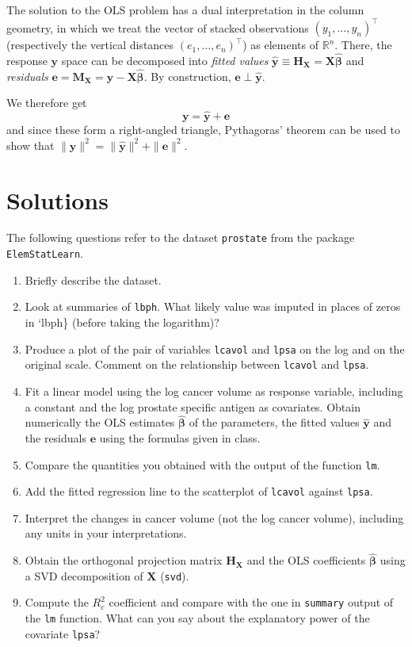\documentclass[]{book}
\providecommand{\tightlist}{%
  \setlength{\itemsep}{0pt}\setlength{\parskip}{0pt}}
\theoremstyle{definition}
\theoremstyle{definition}
\theoremstyle{definition}
\theoremstyle{remark}
\begin{document}
The solution to the OLS problem has a dual interpretation in the column geometry, in which we treat the vector of stacked observations \((y_1, \ldots, y_n)^\top\) (respectively the vertical distances \((e_1, \ldots, e_n)^\top\)) as elements of \(\mathbb{R}^n\). There, the response \(\boldsymbol{y}\) space can be decomposed into \emph{fitted values} \(\hat{{\boldsymbol{y}}} \equiv \mathbf{H}_{\mathbf{X}} = \mathbf{X}\hat{\boldsymbol{\beta}}\) and \emph{residuals} \(\boldsymbol{e} = \mathbf{M}_{\mathbf{X}} = \boldsymbol{y} - \mathbf{X}\hat{\boldsymbol{\beta}}\). By construction, \(\boldsymbol{e} \perp \hat{{\boldsymbol{y}}}\).

We therefore get \[\boldsymbol{y} = \hat{\boldsymbol{y}} + \boldsymbol{e}\]
and since these form a right-angled triangle, Pythagoras' theorem can be used to show that
\(\|\boldsymbol{y}\|^2 = \|\hat{\boldsymbol{y}}\|^2 + \|\boldsymbol{e}\|^2.\)

\hypertarget{solutions-1}{%
\section{Solutions}\label{solutions-1}}

The following questions refer to the dataset \texttt{prostate} from the package \texttt{ElemStatLearn}.

\begin{enumerate}
\def\labelenumi{\alph{enumi}.}
\tightlist
\item
  Briefly describe the dataset.
\item
  Look at summaries of \texttt{lbph}. What likely value was imputed in places of zeros in `lbph\} (before taking the logarithm)?
\item
  Produce a plot of the pair of variables \texttt{lcavol} and \texttt{lpsa} on the log and on the original scale. Comment on the relationship between \texttt{lcavol} and \texttt{lpsa}.
\item
  Fit a linear model using the log cancer volume as response variable, including a constant and the log prostate specific antigen as covariates. Obtain numerically the OLS estimates \(\hat{\boldsymbol{\beta}}\) of the parameters, the fitted values \(\hat{\boldsymbol{y}}\) and the residuals \(\boldsymbol{e}\) using the formulas given in class.
\item
  Compare the quantities you obtained with the output of the function \texttt{lm}.
\item
  Add the fitted regression line to the scatterplot of \texttt{lcavol} against \texttt{lpsa}.
\item
  Interpret the changes in cancer volume (not the log cancer volume), including any units in your interpretations.
\item
  Obtain the orthogonal projection matrix \(\mathbf{H}_\mathbf{X}\) and the OLS coefficients \(\hat{\boldsymbol{\beta}}\) using a SVD decomposition of \(\mathbf{X}\) (\texttt{svd}).
\item
  Compute the \(R^2_c\) coefficient and compare with the one in \texttt{summary} output of the \texttt{lm} function. What can you say about the explanatory power of the covariate \texttt{lpsa}?
\end{enumerate}
\end{document}
